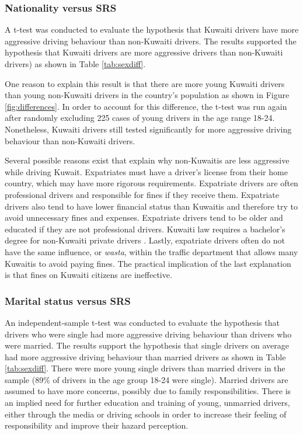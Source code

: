 \documentclass[preprint,12pt,a4paper,authoryear]{elsarticle}
\begin{document}
\subsubsection{Nationality versus SRS}

A t-test was conducted to evaluate the hypothesis that Kuwaiti drivers have more aggressive driving behaviour than non-Kuwaiti drivers. The results supported the hypothesis that Kuwaiti drivers are more aggressive drivers than non-Kuwaiti drivers) as shown in Table \ref{tab:sexdiff}. 

One reason to explain this result is that there are more young Kuwaiti drivers than young non-Kuwaiti drivers in the country's population as shown in Figure \ref{fig:differences}. In order to account for this difference, the  t-test was run again after randomly excluding 225 cases of young drivers in the age range 18-24. Nonetheless, Kuwaiti drivers still tested significantly for more aggressive driving behaviour than non-Kuwaiti drivers.

Several possible reasons exist that explain why non-Kuwaitis are less aggressive while driving Kuwait. Expatriates must have a driver's license from their home country, which may have more rigorous requirements. Expatriate drivers are often professional drivers and responsible for fines if they receive them. Expatriate drivers also tend to have lower financial status than Kuwaitis and therefore try to avoid unnecessary fines and expenses. Expatriate drivers tend to be older and educated if they are not professional drivers. Kuwaiti law requires a bachelor's degree for non-Kuwaiti private drivers \citep{KUNA2014}. Lastly, expatriate drivers often do not have the same influence, or \textit{ wasta}, within the traffic department that allows many Kuwaitis to avoid paying fines. The practical implication of the last explanation is that fines on Kuwaiti citizens are ineffective. 

\subsubsection{Marital status versus SRS}

An independent-sample t-test was conducted to evaluate the hypothesis that drivers who were single had more aggressive driving behaviour than drivers who were married. The results support the hypothesis that single drivers on average had more aggressive driving behaviour than married drivers as shown in Table \ref{tab:sexdiff}. There were more young single drivers than married drivers in the sample (89\% of drivers in the age group 18-24 were single). Married drivers are assumed to have more concerns, possibly due to family responsibilities. There is an implied need for further education and training of young, unmarried drivers, either through the media or driving schools in order to increase their feeling of responsibility and improve their hazard perception. 
\end{document}
